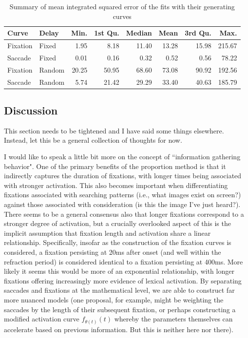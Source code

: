 \documentclass{article}
\begin{document}
\begin{table}[ht]
\centering
\begin{tabular}{llrrrrrr}
  \hline
Curve & Delay & Min. & 1st Qu. & Median & Mean & 3rd Qu. & Max. \\ 
  \hline
Fixation & Fixed & 1.95 & 8.18 & 11.40 & 13.28 & 15.98 & 215.67 \\ 
  Saccade & Fixed & 0.01 & 0.16 & 0.32 & 0.52 & 0.56 & 78.22 \\ 
  Fixation & Random & 20.25 & 50.95 & 68.60 & 73.08 & 90.92 & 192.56 \\ 
  Saccade & Random & 5.74 & 21.42 & 29.29 & 33.40 & 40.63 & 185.79 \\ 
   \hline
\end{tabular}
\caption{Summary of mean integrated squared error of the fits with their generating curves}
\label{tab:mise_fixed_delay}
\end{table}

\subsection{Discussion}

This section needs to be tightened and I have said some things elsewhere. Instead, let this be a general collection of thoughts for now.



I would like to speak a little bit more on the concept of ``information gathering behavior". One of the primary benefits of the proportion method is that it indirectly captures the duration of fixations, with longer times being associated with stronger activation. This also becomes important when differentiating fixations associated with searching patterns (i.e., what images exist on screen?) against those associated with consideration (is this the image I've just heard?). There seems to be a general consensus also that longer fixations correspond to a stronger degree of activation, but a crucially overlooked aspect of this is the implicit assumption that fixation length and activation share a linear relationship. Specifically, insofar as the construction of the fixation curves is considered, a fixation persisting at 20ms after onset (and well within the refraction period) is considered identical to a fixation persisting at 400ms. More likely it seems this would be more of an exponential relationship, with longer fixations offering increasingly more evidence of lexical activation. By separating saccades and fixations at the mathematical level, we are able to construct far more nuanced models (one proposal, for example, might be weighting the saccades by the length of their subsequent fixation, or perhaps constructing a modified activation curve $f_{\theta(t)}(t)$ whereby the parameters themselves can accelerate based on previous information. But this is neither here nor there).
\end{document}
